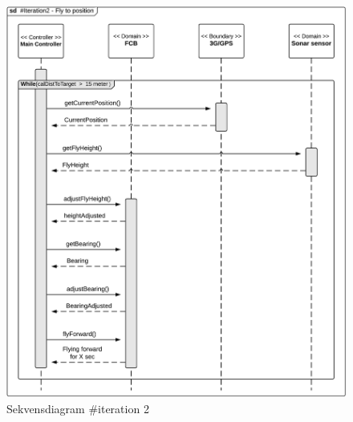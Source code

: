 \begin{figure}[H]
	\centering
	\includegraphics[width=1\textwidth]{Billeder/sekvens/sekvens_iteration2_3}
	\caption{Sekvensdiagram \#iteration 2}
	\label{fig:Sekvens_diagram_iteration2_3}
\end{figure}

\newpage

